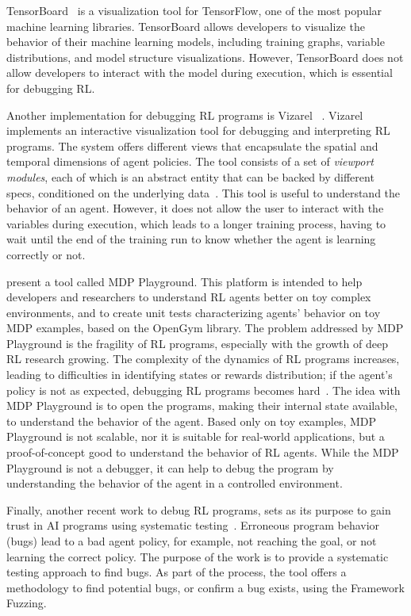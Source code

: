 TensorBoard~\cite{tensorboard} is a 
visualization tool for TensorFlow, one of the most popular machine learning libraries. 
TensorBoard allows developers to visualize the behavior of their machine learning models, 
including training graphs, variable distributions, and model structure visualizations. However, 
TensorBoard does not allow developers to interact with the model during execution, which is 
essential for debugging \ac{RL}.

Another implementation for debugging \ac{RL} programs is \ac{Vizarel} ~\cite{deshpande20}.
\ac{Vizarel} implements an interactive visualization tool for debugging and interpreting \ac{RL} 
programs. The system offers different views that encapsulate the spatial and temporal dimensions 
of agent policies. The tool consists of a set of \emph{viewport modules}, each of which is an 
abstract entity that can be backed by different specs, conditioned on the underlying 
data~\cite{deshpande20}. This tool is useful to understand the behavior of an agent. However, it 
does not allow the user to interact with the variables during execution, which leads to a longer training 
process, having to wait until the end of the training run to know whether the agent is learning correctly 
or not.

\citet{rajan23} present a tool called \ac{MDP} Playground. This platform is intended to help 
developers and researchers to understand \ac{RL} agents better on toy complex environments, and 
to create unit tests characterizing agents' behavior  on toy \ac{MDP} examples, based on the 
OpenGym library. The problem addressed by \ac{MDP} Playground is the fragility of \ac{RL} 
programs, especially with the growth of deep \ac{RL} research growing. The complexity of the 
dynamics of \ac{RL} programs increases, leading to difficulties in identifying states or rewards 
distribution; if the agent's policy is not as expected, debugging \ac{RL} programs becomes 
hard~\cite{rajan23}. The idea with \ac{MDP} Playground is to open the programs, making their 
internal state available, to understand the behavior of the agent. Based only on toy examples, 
\ac{MDP} Playground is not scalable, nor it is suitable for real-world applications, but a 
proof-of-concept good to understand the behavior of \ac{RL} agents. While the \ac{MDP} Playground 
is not a debugger, it can help to debug the program by understanding the behavior of the agent in a 
controlled environment.

Finally, another recent work to debug \ac{RL} programs, sets as its purpose to gain trust in \ac{AI} 
programs using systematic testing~\cite{steinmetz21}. Erroneous program behavior (\ie bugs) lead to 
a bad agent policy, for example, not reaching the goal, or not learning the correct policy. The purpose 
of the work is to provide a systematic testing approach to find bugs. As part of the process, the tool 
offers a methodology to find potential bugs, or confirm a bug exists, using the Framework Fuzzing.


